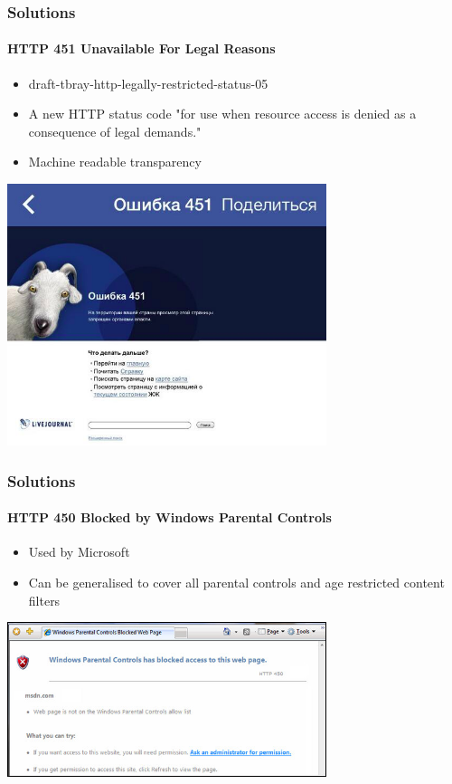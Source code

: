 \documentclass{beamer}
\begin{document}
\begin{frame}
	\frametitle{Solutions}
	\framesubtitle{HTTP 451 Unavailable For Legal Reasons}
	\begin{itemize}
		\item{draft-tbray-http-legally-restricted-status-05}
		\item{A new HTTP status code "for use when resource access is
			denied as a consequence of legal demands."}
		\item{Machine readable transparency}
	\end{itemize}
	\begin{center}
		\includegraphics[width=0.7\textwidth]{http451.png}
	\end{center}

\end{frame}

\begin{frame}
	\frametitle{Solutions}
	\framesubtitle{HTTP 450 Blocked by Windows Parental Controls}
	\begin{itemize}
		\item{Used by Microsoft}
		\item{Can be generalised to cover all parental controls
			and age restricted content filters}
	\end{itemize}
	\begin{center}
		\includegraphics[width=0.7\textwidth]{http450.jpg}
	\end{center}
\end{frame}
\end{document}
